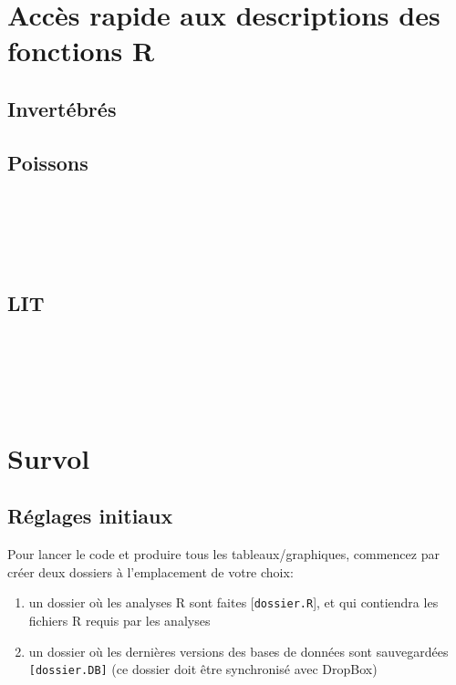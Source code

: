 \documentclass{article}
\begin{document}
\section{Accès rapide aux descriptions des fonctions R}
\subsection{Invertébrés}

\subsection{Poissons}
\hyperlink{p1} {}\\
\hyperlink{p2} {}\\
\hyperlink{p3} {}\\
\hyperlink{p4} {}\\
\hyperlink{p5} {}
\subsection{LIT}
\hyperlink{l1} {}\\
\hyperlink{l2} {}\\
\hyperlink{l3} {}\\
\hyperlink{l4} {}\\
\hyperlink{l5} {}

\clearpage
\section{Survol}

\subsection*{Réglages initiaux}
\label{reglages1}
Pour lancer le code et produire tous les tableaux/graphiques,
commencez par créer deux dossiers à l'emplacement de votre choix:
\begin{enumerate}
      \item un dossier où les analyses R sont faites
      [\texttt{dossier.R}], et qui contiendra les fichiers R requis par
      les analyses
  \item un dossier où les dernières versions des bases de données sont
    sauvegardées \texttt{[dossier.DB]} (ce dossier doit être
    synchronisé avec DropBox)
     \end{enumerate}
\end{document}
